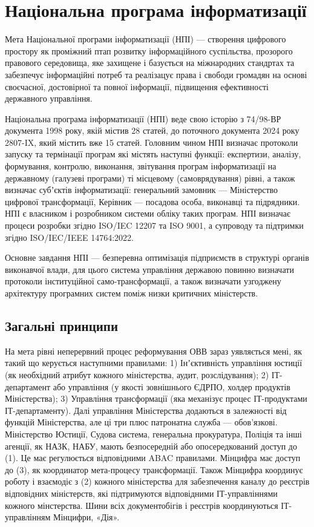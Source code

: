 \chapter{Національна програма інформатизації}

Мета Національної програми інформатизації (НПІ) --- створення цифрового простору як
проміжний птап розвитку інформаційного суспільства, прозорого правового середовища,
яке захищене і базується на міжнародних стандртах та забезпечує інформаційні потреб та
реалізацує права і свободи громадян на основі своєчасної, достовірної та повної інформації,
підвищення ефективності державного управління.

Національна програма інформатизації (НПІ) веде свою історію з 74/98-ВР документа 1998 року,
якій містив 28 статей, до поточного документа 2024 року 2807-IX, який містить вже 15 статей.
Головним чином НПІ визначає протоколи запуску та термінації програм які містять наступні функції:
експертизи, аналізу, формування, контролю, виконання, звітування програм інформатизації
на державному (галузеві програми) ті місцевому (самоврядування) рівні, а також визначає
субʼєктів інформатизації: генеральний замовник --- Міністерство цифрової трансформації,
Керівник --- посадова особа, виконавці та підрядники. НПІ є власником і розробником
системи обліку таких програм. НПІ визначає процеси розробки згідно ISO/IEC 12207 та ISO 9001,
а супроводу та підтримки згідно ISO/IEC/IEEE 14764:2022.

Основне завдання НПІ — безперевна оптимізація підприємств
в структурі органів виконавчої влади, для цього система управління державою повинно
визначати протоколи інституційної само-трансформації, а також визначати узгоджену
архітектуру програмних систем поміж низки критичних міністерств.

\section{Загальні принципи}

На мета рівні неперервний процес реформування ОВВ зараз уявляється мені,
як такий що керується наступними правилами: 1) Інʼєктивність управління
юстиції (як необхідний атрибут кожного міністерства, аудит, розслідування);
2) ІТ-департамент або управління (у якості зовнішнього ЄДРПО, холдер продуктів
Міністерства); 3) Управління трансформації (яка механізує процес ІТ-продуктами
ІТ-департаменту). Далі управління Міністерства додаються в залежності від
функцій Міністерства, але ці три плюс патронатна служба — обов’язкові.
Міністерство Юстиції, Судова система, генеральна прокуратура, Поліція
та інші агенції, як НАЗК, НАБУ, мають безпосередній або опосередкований
доступ до (1). Це має регулюється відповідними ABAC правилами. Мінцифра
має доступ до (3), як координатор мета-процесу трансформації. Також
Мінцифра координує роботу і взаємодіє з (2) кожного міністерства для
забезпечення каналу до реєстрів відповідних міністерств, які підтримуются
відповідними ІТ-управліннями кожного мінстерства. Шини всіх документобігів
і реєстрів координуються ІТ-управлінням Мінцифри, «Дія».

